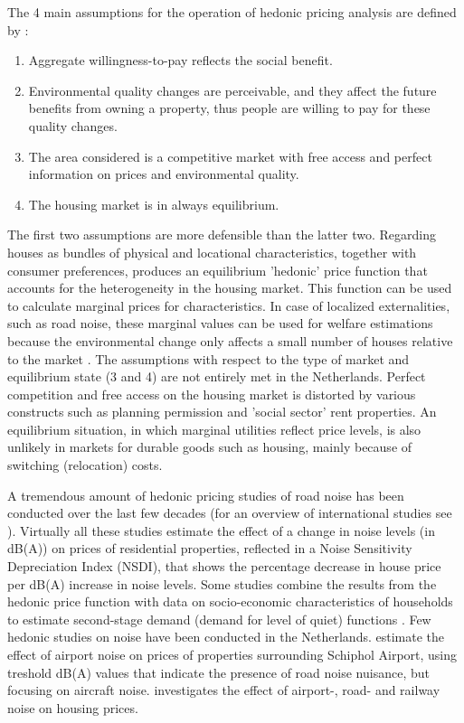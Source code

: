 \documentclass[12pt]{scrartcl}
\begin{document}
		The 4 main assumptions for the operation of hedonic pricing analysis are defined by \cite{Bateman1993}:
		\begin{enumerate}
			\item Aggregate willingness-to-pay reflects the social benefit.
			\item Environmental quality changes are perceivable, and they affect the future benefits from owning a property, thus people are willing to pay for these quality changes.
			\item The area considered is a competitive market with free access and perfect information on prices and environmental quality.
			\item The housing market is in always equilibrium.
		\end{enumerate}
		
		The first two assumptions are more defensible than the latter two. Regarding houses as bundles of physical and locational characteristics, together with consumer preferences, produces an equilibrium 'hedonic' price function that accounts for the heterogeneity in the housing market. This function can be used to calculate marginal prices for characteristics. In case of localized externalities, such as road noise, these marginal values can be used for welfare estimations because the environmental change only affects a small number of houses relative to the market \citep{Nelson2008}. The assumptions with respect to the type of market and equilibrium state (3 and 4) are not entirely met in the Netherlands. Perfect competition and free access on the housing market is distorted by various constructs such as planning permission and 'social sector' rent properties. An equilibrium situation, in which marginal utilities reflect price levels, is also unlikely in markets for durable goods such as housing, mainly because of switching (relocation) costs. 
	
		A tremendous amount of hedonic pricing studies of road noise has been conducted over the last few decades (for an overview of international studies see \cite{Bateman2001,Navrud2011}). Virtually all these studies estimate the effect of a change in noise levels (in dB(A)) on prices of residential properties, reflected in a Noise Sensitivity Depreciation Index (NSDI), that shows the percentage decrease in house price per dB(A) increase in noise levels. Some studies combine the results from the hedonic price function with data on socio-economic characteristics of households to estimate second-stage demand (demand for level of quiet) functions \citep{Swardh2012,Day2007}. Few hedonic studies on noise have been conducted in the Netherlands. \cite{Dekkers2009} estimate the effect of airport noise on prices of properties surrounding Schiphol Airport, using treshold dB(A) values that indicate the presence of road noise nuisance, but focusing on aircraft noise. \cite{Theebe2004} investigates the effect of airport-, road- and railway noise on housing prices. 
\end{document}
